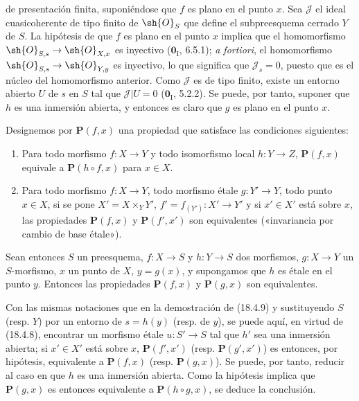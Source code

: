 
de presentación finita, suponiéndose que $f$ es plano en el punto $x$. Sea $\mathscr J$ el ideal cuasicoherente de tipo finito de $\sh{O}_S$ que define el subpreesquema cerrado $Y$ de $S$. La hipótesis de que $f$ es plano en el punto $x$ implica que el homomorfismo $\sh{O}_{S,s}\to\sh{O}_{X,x}$ es inyectivo ($\mathbf 0_{\mathrm I}$, 6.5.1); \emph{a fortiori}, el homomorfismo $\sh{O}_{S,s}\to\sh{O}_{Y,y}$ es inyectivo, lo que significa que $\mathscr J_s=0$, puesto que es el núcleo del homomorfismo anterior. Como $\mathscr J$ es de tipo finito, existe un entorno abierto $U$ de $s$ en $S$ tal que $\mathscr J|U=0$ ($\mathbf 0_{\mathrm I}$, 5.2.2). Se puede, por tanto, suponer que $h$ es una inmersión abierta, y entonces es claro que $g$ es plano en el punto $x$.

\begin{proposition}[18.4.10]
\label{IV.18.4.10}
Designemos por $\boldsymbol{P}(f,x)$ una propiedad que satisface las condiciones siguientes:
\begin{enumerate}
  \item[$1^\circ$] Para todo morfismo $f:X\to Y$ y todo isomorfismo local $h:Y\to Z$, $\boldsymbol{P}(f,x)$ equivale a $\boldsymbol{P}(h\circ f,x)$ para $x\in X$.
  \item[$2^\circ$] Para todo morfismo $f:X\to Y$, todo morfismo étale $g:Y'\to Y$, todo punto $x\in X$, si se pone $X'=X\times_Y Y'$, $f'=f_{(Y')}:X'\to Y'$ y si $x'\in X'$ está sobre $x$, las propiedades $\boldsymbol{P}(f,x)$ y $\boldsymbol{P}(f',x')$ son equivalentes \textup{(«invariancia por cambio de base étale»)}.
\end{enumerate}
Sean entonces $S$ un preesquema, $f:X\to S$ y $h:Y\to S$ dos morfismos, $g:X\to Y$ un $S$-morfismo, $x$ un punto de $X$, $y=g(x)$, y supongamos que $h$ es étale en el punto $y$. Entonces las propiedades $\boldsymbol{P}(f,x)$ y $\boldsymbol{P}(g,x)$ son equivalentes.
\end{proposition}

Con las mismas notaciones que en la demostración de (18.4.9) y sustituyendo $S$ (resp. $Y$) por un entorno de $s=h(y)$ (resp. de $y$), se puede aquí, en virtud de (18.4.8), encontrar un morfismo étale $u:S'\to S$ tal que $h'$ sea una inmersión abierta; si $x'\in X'$ está sobre $x$, $\boldsymbol{P}(f',x')$ (resp. $\boldsymbol{P}(g',x')$) es entonces, por hipótesis, equivalente a $\boldsymbol{P}(f,x)$ (resp. $\boldsymbol{P}(g,x)$). Se puede, por tanto, reducir al caso en que $h$ es una inmersión abierta. Como la hipótesis implica que $\boldsymbol{P}(g,x)$ es entonces equivalente a $\boldsymbol{P}(h\circ g,x)$, se deduce la conclusión.

